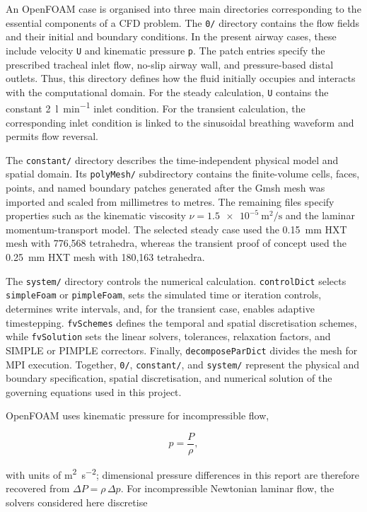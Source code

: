 \documentclass[11pt,a4paper]{article}
\begin{document}
An OpenFOAM case is organised into three main directories corresponding to the
essential components of a CFD problem. The \texttt{0/} directory contains the
flow fields and their initial and boundary conditions. In the present airway
cases, these include velocity \texttt{U} and kinematic pressure \texttt{p}. The
patch entries specify the prescribed tracheal inlet flow, no-slip airway wall,
and pressure-based distal outlets. Thus, this directory defines how the fluid
initially occupies and interacts with the computational domain. For the steady
calculation, \texttt{U} contains the constant \SI{2}{\litre\per\minute} inlet
condition. For the transient calculation, the corresponding inlet condition is
linked to the sinusoidal breathing waveform and permits flow reversal.

The \texttt{constant/} directory describes the time-independent physical model
and spatial domain. Its \texttt{polyMesh/} subdirectory contains the
finite-volume cells, faces, points, and named boundary patches generated after
the Gmsh mesh was imported and scaled from millimetres to metres. The remaining
files specify properties such as the kinematic viscosity
$\nu=\SI{1.5e-5}{\metre\squared\per\second}$ and the laminar momentum-transport
model. The selected steady case used the \num{0.15}~mm HXT mesh with 776,568
tetrahedra, whereas the transient proof of concept used the \num{0.25}~mm HXT
mesh with 180,163 tetrahedra.

The \texttt{system/} directory controls the numerical calculation.
\texttt{controlDict} selects \texttt{simpleFoam} or \texttt{pimpleFoam}, sets
the simulated time or iteration controls, determines write intervals, and, for
the transient case, enables adaptive timestepping. \texttt{fvSchemes} defines
the temporal and spatial discretisation schemes, while \texttt{fvSolution}
sets the linear solvers, tolerances, relaxation factors, and SIMPLE or PIMPLE
correctors. Finally, \texttt{decomposeParDict} divides the mesh for MPI
execution. Together, \texttt{0/}, \texttt{constant/}, and \texttt{system/}
represent the physical and boundary specification, spatial discretisation, and
numerical solution of the governing equations used in this project.

OpenFOAM uses kinematic pressure for incompressible flow,

\begin{equation}
  p=\frac{P}{\rho},
\end{equation}

with units of \si{\metre\squared\per\second\squared}; dimensional pressure
differences in this report are therefore recovered from
$\Delta P=\rho\,\Delta p$. For incompressible Newtonian laminar flow, the
solvers considered here discretise
\end{document}

